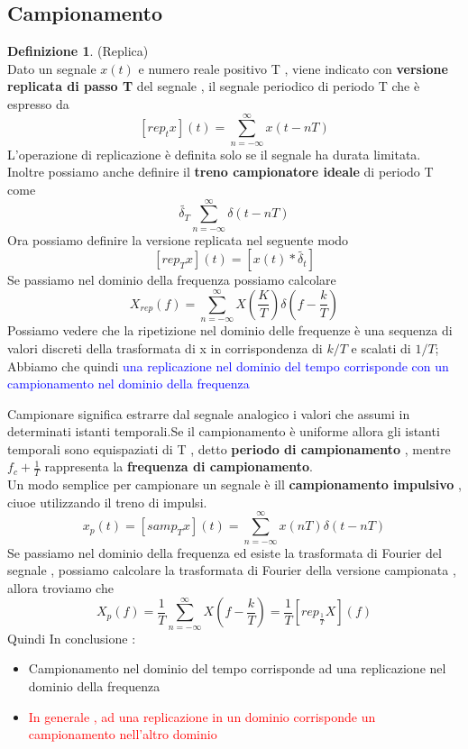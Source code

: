 \documentclass{article}
\theoremstyle{definition}
\newtheorem*{definizione}{Definizione}
\newcommand{\suminf}{\sum_{n=-\infty}^{\infty}}
\begin{document}
	\subsection{Campionamento}
	\begin{definizione}(Replica)\\
		Dato un segnale $x(t)$ e numero reale positivo T , viene indicato con \textbf{versione replicata di passo T} del segnale , il segnale periodico di periodo T che è espresso da 
		$$[rep_tx](t)=\sum_{n=-\infty}^{\infty}x(t-nT)$$
		L'operazione di replicazione è definita solo se il segnale ha durata limitata.\\
		Inoltre possiamo anche definire il \textbf{treno campionatore ideale} di periodo T come 
		$$\widetilde{\delta_T}\sum_{n=-\infty}^{\infty}\delta(t-nT)$$ 
		Ora possiamo definire la versione replicata nel seguente modo 
		$$[rep_Tx](t)=[x(t)*\widetilde{\delta_t}]$$
		Se passiamo nel dominio della frequenza possiamo calcolare $$X_{rep}(f)=\suminf X\left(\frac{K}{T}\right)\delta\left(f-\frac{k}{T}\right)$$
		Possiamo vedere che la ripetizione nel dominio delle frequenze è una sequenza di valori discreti della trasformata di x in corrispondenza di $k/T$ e scalati di $1/T$;
		Abbiamo che quindi \textcolor{blue}{una replicazione nel dominio del tempo corrisponde con un campionamento nel dominio della frequenza}
	\end{definizione}
	Campionare significa estrarre dal segnale analogico i valori che assumi in determinati istanti temporali.Se il campionamento è uniforme allora gli istanti temporali sono equispaziati di T , detto \textbf{periodo di campionamento} , mentre $f_c+\frac{1}{T}$ rappresenta la \textbf{frequenza di campionamento}.\\
	Un modo semplice per campionare un segnale è ill \textbf{campionamento impulsivo} , ciuoe utilizzando il treno di impulsi. 
	$$x_p(t)=[samp_Tx](t)=\suminf x(nT)\delta(t-nT)$$
	Se passiamo nel dominio della frequenza ed esiste la trasformata di Fourier del segnale , possiamo calcolare la trasformata di Fourier della versione campionata , allora troviamo che 
	$$X_p(f)=\frac{1}{T}\suminf X(f-\frac{k}{T})=\frac{1}{T}[rep_{\frac{1}{T}}X](f)$$
Quindi In conclusione : 
\begin{itemize}
	\item Campionamento nel dominio del tempo corrisponde ad una replicazione nel dominio della frequenza 
	\item\textcolor{red}{ In generale , ad una replicazione in un dominio corrisponde un campionamento nell'altro dominio}
\end{itemize}
\end{document}
